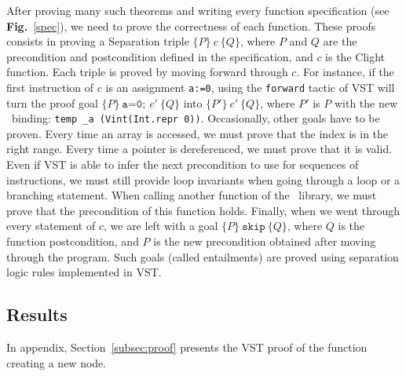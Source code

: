 After proving many such theorems and writing every function specification (see \textbf{Fig.}~\ref{spec}), we need to prove the correctness of each function.
These proofs consists in proving a Separation triple $\{P\}~c~\{Q\}$, where $P$ and $Q$ are the precondition and postcondition defined in the specification, and $c$ is the Clight function.
Each triple is proved by moving forward through $c$.
For instance, if the first instruction of $c$ is an assignment \texttt{a:=0}, using the \lstinline[language=Coq]{forward} tactic of VST will turn the proof goal $\{P\}~\texttt{a=0};~c'~\{Q\}$ into $\{P'\}~c'~\{Q\}$,
where $P'$ is $P$ with the new \local\ binding: \texttt{temp \_a (Vint(Int.repr 0))}.
Occasionally, other goals have to be proven.
Every time an array is accessed, we must prove that the index is in the right range.
Every time a pointer is dereferenced, we must prove that it is valid.
Even if VST is able to infer the next precondition to use for sequences of instructions, we must still provide loop invariants when going through a loop or a branching statement.
When calling another function of the \btrees\ library, we must prove that the precondition of this function holds.
Finally, when we went through every statement of $c$, we are left with a goal $\{P\}~\texttt{skip}~\{Q\}$, where $Q$ is the function postcondition, and $P$ is the new precondition obtained after moving through the program.
Such goals (called entailments) are proved using separation logic rules implemented in VST.

\subsection{Results}
In appendix, Section~\ref{subsec:proof} presents the VST proof of the function creating a new node.
